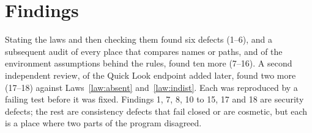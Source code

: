 \section{Findings}
\label{sec:findings}

Stating the laws and then checking them found six defects (1--6), and a
subsequent audit of every place that compares names or paths, and of the
environment assumptions behind the rules, found ten more (7--16).  A second
independent review, of the Quick Look endpoint added later, found two more (17--18)
against Laws~\ref{law:absent} and~\ref{law:indist}.  Each was
reproduced by a failing test before it was fixed.  Findings 1, 7, 8, 10 to 15, 17
and 18 are security defects; the rest are consistency defects that fail closed
or are cosmetic, but each is a place where two parts of the program disagreed.

